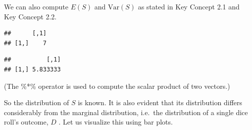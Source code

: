 \documentclass[]{book}
\newenvironment{Shaded}{\begin{snugshade}}{\end{snugshade}}
\newcommand{\KeywordTok}[1]{\textcolor[rgb]{0.13,0.29,0.53}{\textbf{#1}}}
\newcommand{\DecValTok}[1]{\textcolor[rgb]{0.00,0.00,0.81}{#1}}
\newcommand{\StringTok}[1]{\textcolor[rgb]{0.31,0.60,0.02}{#1}}
\newcommand{\CommentTok}[1]{\textcolor[rgb]{0.56,0.35,0.01}{\textit{#1}}}
\newcommand{\OperatorTok}[1]{\textcolor[rgb]{0.81,0.36,0.00}{\textbf{#1}}}
\newcommand{\NormalTok}[1]{#1}
\theoremstyle{definition}
\theoremstyle{definition}
\theoremstyle{definition}
\theoremstyle{remark}
\begin{document}
We can also compute \(E(S)\) and \(\text{Var}(S)\) as stated in Key
Concept 2.1 and Key Concept 2.2.

\begin{Shaded}
\end{Shaded}

\begin{verbatim}
##      [,1]
## [1,]    7
\end{verbatim}

\begin{Shaded}
\end{Shaded}

\begin{verbatim}
##          [,1]
## [1,] 5.833333
\end{verbatim}

(The \%*\% operator is used to compute the scalar product of two
vectors.)

So the distribution of \(S\) is known. It is also evident that its
distribution differs considerably from the marginal distribution,
i.e.~the distribution of a single dice roll's outcome, \(D\) . Let us
visualize this using bar plots.
\end{document}
